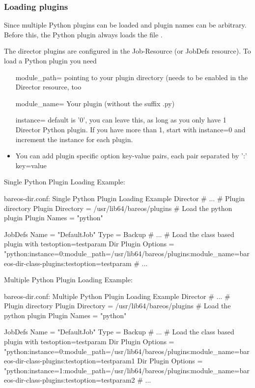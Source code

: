 \subsubsection{Loading plugins}

Since  multiple Python plugins can be loaded and plugin names can be arbitrary. Before this, the Python plugin always loads the file .

The director plugins are configured in the Job-Resource (or JobDefs resource). To load a Python plugin you need
\begin{itemize}
 \item [module\_path= ] pointing to your plugin directory (needs to be enabled in the Director resource, too
 \item [module\_name= ] Your plugin (without the suffix .py)
 \item [instance= ] default is '0', you can leave this, as long as you only have 1 Director Python plugin. If you have more than 1, start with instance=0 and increment the instance for each plugin.
 \item You can add plugin specific option key-value pairs, each pair separated by ':' key=value
\end{itemize}


Single Python Plugin Loading Example:

\begin{bconfig}{bareos-dir.conf: Single Python Plugin Loading Example}
Director {
  # ...
  # Plugin directory
  Plugin Directory = /usr/lib64/bareos/plugins
  # Load the python plugin
  Plugin Names = "python"
}

JobDefs {
  Name = "DefaultJob"
  Type = Backup
  # ...
  # Load the class based plugin with testoption=testparam
  Dir Plugin Options = "python:instance=0:module_path=/usr/lib64/bareos/plugins:module_name=bareos-dir-class-plugins:testoption=testparam
  # ...
}
\end{bconfig}


Multiple Python Plugin Loading Example:

\begin{bconfig}{bareos-dir.conf: Multiple Python Plugin Loading Example}
Director {
  # ...
  # Plugin directory
  Plugin Directory = /usr/lib64/bareos/plugins
  # Load the python plugin
  Plugin Names = "python"
}

JobDefs {
  Name = "DefaultJob"
  Type = Backup
  # ...
  # Load the class based plugin with testoption=testparam
  Dir Plugin Options = "python:instance=0:module_path=/usr/lib64/bareos/plugins:module_name=bareos-dir-class-plugins:testoption=testparam1
  Dir Plugin Options = "python:instance=1:module_path=/usr/lib64/bareos/plugins:module_name=bareos-dir-class-plugins:testoption=testparam2
  # ...
}
\end{bconfig}


